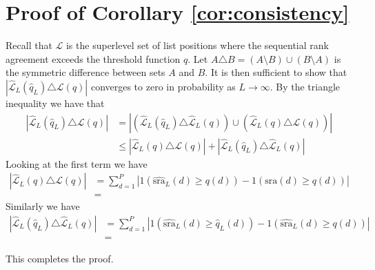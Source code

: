 \documentclass[12pt,a4paper]{article}
\newcommand{\nn}{\nonumber}
\theoremstyle{plain}
\begin{document}
\section{Proof of Corollary \ref{cor:consistency}}
\label{sec:appB}

Recall that $\mathcal{L}$ is the superlevel set of list positions
where the sequential rank agreement exceeds the threshold function
$q$. Let $A \triangle B = (A \setminus B) \cup (B \setminus A)$ is the
symmetric difference between sets $A$ and $B$. It is then sufficient
to show that
$|\widehat{\mathcal{L}}_L(\widehat{q}_L) \triangle \mathcal{L}(q)|$
converges to zero in probability as $L \rightarrow \infty$. By the
triangle inequality we have that
\begin{align}
 \left|\widehat{\mathcal{L}}_L(\widehat{q}_L) \triangle \mathcal{L}(q)\right| &= \left|\left(\widehat{\mathcal{L}}_L(\widehat{q}_L) \triangle \widehat{\mathcal{L}}_L(q)\right) \cup \left(\widehat{\mathcal{L}}_L(q) \triangle \mathcal{L}(q)\right)\right|\label{eq:corSetDiff}\\
   &\leq \left|\widehat{\mathcal{L}}_L(q) \triangle \mathcal{L}(q)\right| + \left|\widehat{\mathcal{L}}_L(\widehat{q}_L) \triangle \widehat{\mathcal{L}}_L(q)\right|\nn
\end{align}
Looking at the first term we have
\begin{align}
  \left|\widehat{\mathcal{L}}_L(q) \triangle \mathcal{L}(q)\right| &= \sum_{d=1}^P \left|1\left(\widehat{\textrm{sra}}_L(d) \geq q(d)\right)  - 1\left(\textrm{sra}(d)  \geq q(d)\right)\right|\\
   &=
\end{align}
Similarly we have
\begin{align}
\left|\widehat{\mathcal{L}}_L(\widehat{q}_L) \triangle \widehat{\mathcal{L}}_L(q)\right| &= \sum_{d=1}^P \left|1\left(\widehat{\textrm{sra}}_L(d) \geq \widehat{q}_L(d)\right) - 1\left(\widehat{\textrm{sra}}_L(d) \geq q(d)\right)\right|\\
   &=
\end{align}


This completes the proof.
\end{document}
